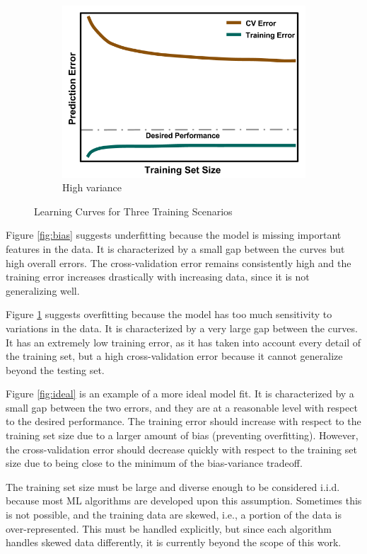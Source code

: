 \begin{figure}[!hp]
\begin{subfigure}[h]{0.65\linewidth}
    \includegraphics[width=\linewidth]{./chapters/litrev/LearningCurve-variance.png}
    \caption{High variance}
    \label{fig:variance}
  \end{subfigure}
  \caption{Learning Curves for Three Training Scenarios}
  \label{fig:learning}
\end{figure}

Figure \ref{fig:bias} suggests underfitting because the model is missing
important features in the data. It is characterized by a small gap between the
curves but high overall errors. The cross-validation error remains consistently
high and the training error increases drastically with increasing data, since
it is not generalizing well. 

Figure \ref{fig:variance} suggests overfitting because the model has too much
sensitivity to variations in the data. It is characterized by a very large gap
between the curves. It has an extremely low training error, as it has taken
into account every detail of the training set, but a high cross-validation
error because it cannot generalize beyond the testing set. 

Figure \ref{fig:ideal} is an example of a more ideal model fit. It is
characterized by a small gap between the two errors, and they are at a
reasonable level with respect to the desired performance.  The training error
should increase with respect to the training set size due to a larger amount of
bias (preventing overfitting). However, the cross-validation error should decrease
quickly with respect to the training set size due to being close to the minimum
of the bias-variance tradeoff. 

The training set size must be large and diverse enough to be considered
\gls{i.i.d.} because most \gls{ML} algorithms are developed upon this
assumption. Sometimes this is not possible, and the training data are skewed,
i.e., a portion of the data is over-represented. This must be handled
explicitly, but since each algorithm handles skewed data differently, it is
currently beyond the scope of this work. 

